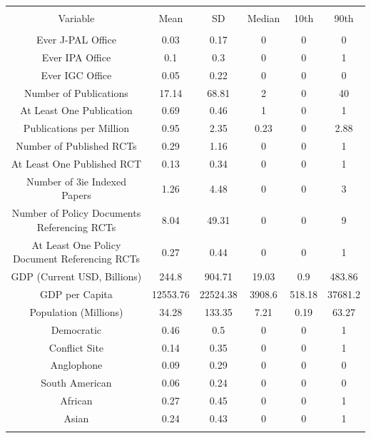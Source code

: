 

\begin{tabular}{@{\extracolsep{5pt}} cccccc} 
\\[-1.8ex]\hline 
\hline \\[-1.8ex] 
Variable & Mean & SD & Median & 10th & 90th \\ 
\hline \\[-1.8ex] 
Ever J-PAL Office & 0.03 & 0.17 & 0 & 0 & 0 \\ 
Ever IPA Office & 0.1 & 0.3 & 0 & 0 & 1 \\ 
Ever IGC Office & 0.05 & 0.22 & 0 & 0 & 0 \\ 
Number of Publications & 17.14 & 68.81 & 2 & 0 & 40 \\ 
At Least One Publication & 0.69 & 0.46 & 1 & 0 & 1 \\ 
Publications per Million & 0.95 & 2.35 & 0.23 & 0 & 2.88 \\ 
Number of Published RCTs & 0.29 & 1.16 & 0 & 0 & 1 \\ 
At Least One Published RCT & 0.13 & 0.34 & 0 & 0 & 1 \\ 
Number of 3ie Indexed Papers & 1.26 & 4.48 & 0 & 0 & 3 \\ 
Number of Policy Documents Referencing RCTs & 8.04 & 49.31 & 0 & 0 & 9 \\ 
At Least One Policy Document Referencing RCTs & 0.27 & 0.44 & 0 & 0 & 1 \\ 
GDP (Current USD, Billions) & 244.8 & 904.71 & 19.03 & 0.9 & 483.86 \\ 
GDP per Capita & 12553.76 & 22524.38 & 3908.6 & 518.18 & 37681.2 \\ 
Population (Millions) & 34.28 & 133.35 & 7.21 & 0.19 & 63.27 \\ 
Democratic & 0.46 & 0.5 & 0 & 0 & 1 \\ 
Conflict Site & 0.14 & 0.35 & 0 & 0 & 1 \\ 
Anglophone & 0.09 & 0.29 & 0 & 0 & 0 \\ 
South American & 0.06 & 0.24 & 0 & 0 & 0 \\ 
African & 0.27 & 0.45 & 0 & 0 & 1 \\ 
Asian & 0.24 & 0.43 & 0 & 0 & 1 \\ 
\hline \\[-1.8ex] 
\end{tabular} 



